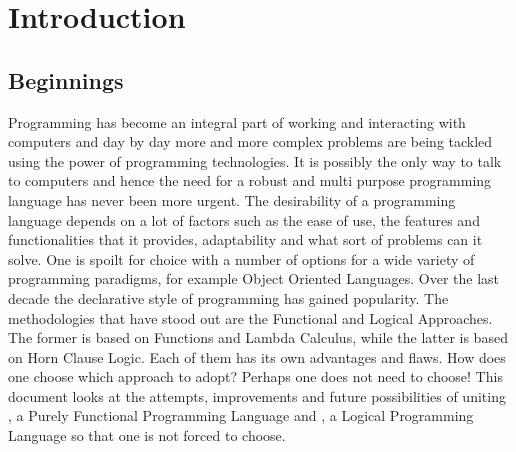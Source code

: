 \documentclass[thesis-solanki.tex]{subfiles}
\begin{document}
\chapter{Introduction}\label{chap:introduction}

\section{Beginnings}
\begin{comment}
Computers have become a part of everyone's life. From the ones in our pockets to the ones on desks or in our school bags, working or in fact living without 
them is difficult if not impossible. All the more reason to know how to use one. Simply speaking just using a computer these days is not enough. To be able 
to utilise their true potential, one must go deeper and communicate with them. This is where the art of programming steps in.     
\end{comment}

\par Programming has become an integral part of working and interacting with computers and day by day more and more complex problems are being 
tackled using the power of programming technologies. It is possibly the only way to talk to computers and hence the need for a robust and multi purpose 
programming language has never been more urgent. The desirability of a programming language depends on a lot of factors such as the ease of use, the 
features and functionalities that it provides, adaptability and what sort of problems can it solve. One is  spoilt for choice with a number of options for a 
wide variety of programming paradigms, for example Object Oriented Languages. Over the last decade the declarative style of programming has gained 
popularity. The methodologies that have stood out are the Functional and Logical Approaches. The former is based on Functions and Lambda Calculus, 
while the latter is based on Horn Clause Logic. Each of them has its own advantages and ﬂaws. How does one choose which approach to adopt? Perhaps
one does not need to choose! This document looks at the attempts, improvements and future possibilities of uniting , a Purely 
Functional Programming Language and , a Logical Programming Language so that one is not forced to choose.
\end{document}
